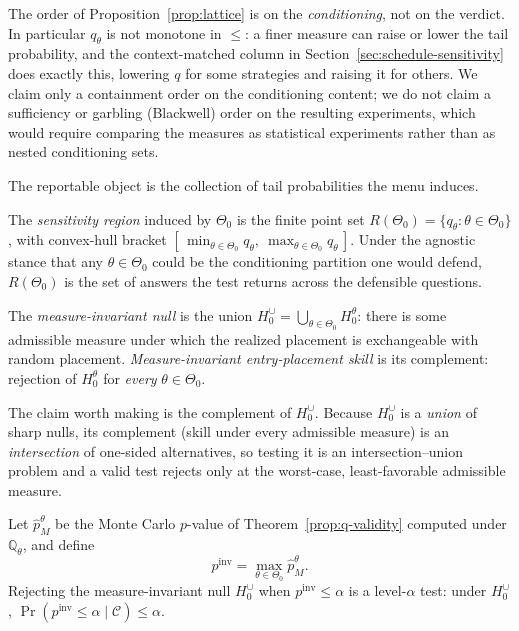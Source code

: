 \documentclass[risks,article,submit,pdftex,oneauthor]{Definitions/mdpi}
\begin{document}
The order of Proposition~\ref{prop:lattice} is on the \emph{conditioning}, not on the verdict. In particular
$q_\theta$ is not monotone in $\le$: a finer measure can raise or lower the tail
probability, and the context-matched column in
Section~\ref{sec:schedule-sensitivity} does exactly this, lowering $q$ for some
strategies and raising it for others. We claim only a containment order on the
conditioning content; we do not claim a sufficiency or garbling (Blackwell) order
on the resulting experiments, which would require comparing the measures as
statistical experiments rather than as nested conditioning sets.

The reportable object is the collection of tail probabilities the menu induces.

\begin{Definition}
\label{def:id-region}
The \emph{sensitivity region} induced by $\Theta_0$ is the finite point set
$R(\Theta_0)=\{q_\theta:\theta\in\Theta_0\}$, with convex-hull bracket
$[\,\min_{\theta\in\Theta_0}q_\theta,\ \max_{\theta\in\Theta_0}q_\theta\,]$. Under
the agnostic stance that any $\theta\in\Theta_0$ could be the conditioning
partition one would defend, $R(\Theta_0)$ is the set of answers the test returns
across the defensible questions.
\end{Definition}

\begin{Definition}
\label{def:invariant}
The \emph{measure-invariant null} is the union
$H_0^{\cup}=\bigcup_{\theta\in\Theta_0}H_0^\theta$: there is some admissible
measure under which the realized placement is exchangeable with random placement.
\emph{Measure-invariant entry-placement skill} is its complement: rejection of
$H_0^\theta$ for \emph{every} $\theta\in\Theta_0$.
\end{Definition}

The claim worth making is the complement of $H_0^{\cup}$. Because $H_0^{\cup}$ is a
\emph{union} of sharp nulls, its complement (skill under every admissible measure)
is an \emph{intersection} of one-sided alternatives, so testing it is an
intersection--union problem and a valid test rejects only at the worst-case,
least-favorable admissible measure.

\begin{Theorem}
\label{prop:iut}
Let $\hat p_M^\theta$ be the Monte Carlo $p$-value of
Theorem~\ref{prop:q-validity} computed under $\mathbb{Q}_\theta$, and define
\[
p^{\mathrm{inv}}=\max_{\theta\in\Theta_0}\hat p_M^\theta .
\]
Rejecting the measure-invariant null $H_0^{\cup}$ when
$p^{\mathrm{inv}}\le\alpha$ is a level-$\alpha$ test: under $H_0^{\cup}$,
$\Pr(p^{\mathrm{inv}}\le\alpha\mid\mathcal C)\le\alpha$.
\end{Theorem}
\end{document}
